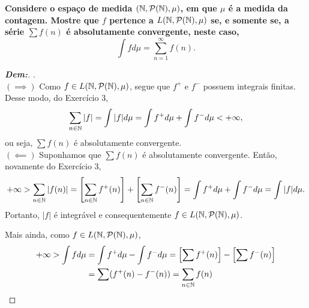 \textbf{Considere o espaço de medida $(\mathbb N, \mathcal P(\mathbb N), \mu)$, em que $\mu$ é a medida da contagem. 
Mostre que $f$ pertence a $L(\mathbb N, \mathcal P(\mathbb N), \mu)$ se, e somente se, a série $\sum f(n)$ é 
absolutamente convergente, neste caso, 
$$\int f d\mu = \sum_{n=1}^\infty f(n).$$}
\begin{proof}[\textbf{Dem:}].\\ 
  $(\implies)$ Como $f \in L(\mathbb N, \mathcal P(\mathbb N), \mu)$, segue que $f^+$ e 
  $f^-$ possuem integrais finitas. Desse modo, do Exercício 3, 
  \begin{align*}
    \sum_{n \in \mathbb N} |f| =\int |f| d\mu = \int f^+ d\mu + \int f^- d\mu< +\infty, 
  \end{align*}
  ou seja, $\sum f(n)$ é absolutamente convergente.\\
  $(\impliedby)$ Suponhamos que $\sum f(n)$ é absolutamente convergente. Então,
  novamente do Exercício 3,
  \begin{align*}
    +\infty > \sum_{n \in \mathbb N} |f(n)| = \left[\sum_{n \in \mathbb N} f^+(n)\right] + 
    \left[\sum_{n \in \mathbb N} f^-(n)\right] = \int f^+ d\mu + \int f^- d\mu 
    = \int |f| d\mu.
  \end{align*}
  Portanto, $|f|$ é integrável e consequentemente $f \in L(\mathbb N, \mathcal P(\mathbb N), \mu)$. 

  Mais ainda, como $f \in L(\mathbb N, \mathcal P(\mathbb N), \mu)$, 
  \begin{align*}
    +\infty > \int f d\mu &= \int f^+ d\mu - \int f^- d\mu = 
    \left[\sum f^+(n)\right] - \left[\sum f^-(n)\right]\\ 
    &= \sum (f^+(n) - f^-(n)) = \sum_{n \in \mathbb N} f(n)
  \end{align*}
\end{proof}

